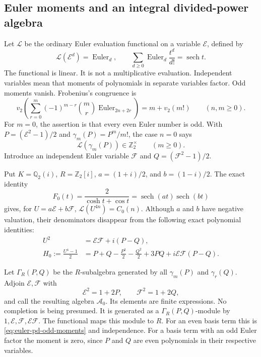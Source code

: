 \subsection{Euler moments and an integral divided-power algebra}

Let $\mathcal L$ be the ordinary Euler evaluation functional on a
variable $\mathcal E$, defined by
\[
 \mathcal L(\mathcal E^d)=\operatorname{Euler}_d,
 \qquad \sum_{d\geq0}\operatorname{Euler}_d\frac{t^d}{d!}
                  =\operatorname{sech}t.
\]
The functional is linear. It is not a multiplicative evaluation.
Independent variables mean that moments of polynomials in separate
variables factor. Odd moments vanish. Frobenius's congruence is
\begin{equation}
 v_2\left(\sum_{r=0}^m(-1)^{m-r}\binom mr
                 \operatorname{Euler}_{2n+2r}\right)
       =m+v_2(m!)\qquad(n,m\geq0).
 \label{eq:classical-frobenius-exact}
\end{equation}
For $m=0$, the assertion is that every even Euler number is odd.
With $P=(\mathcal E^2-1)/2$ and
$\gamma_m(P)=P^m/m!$, the case $n=0$ says
\begin{equation}
 \mathcal L(\gamma_m(P))\in\mathbb Z_2^{\times}
                 \qquad(m\geq0).
 \label{eq:euler-pd-odd-moments}
\end{equation}
Introduce an independent Euler variable $\mathcal F$ and
$Q=(\mathcal F^2-1)/2$.

Put $K=\mathbb Q_2(i)$, $R=\mathbb Z_2[i]$,
$a=(1+i)/2$, and $b=(1-i)/2$. The exact identity
\begin{equation}
 F_0(t)=\frac{2}{\cosh t+\cos t}
       =\operatorname{sech}(at)\operatorname{sech}(bt)
 \label{eq:four-euler-factorization}
\end{equation}
gives, for $U=a\mathcal E+b\mathcal F$,
$\mathcal L(U^{4n})=C_0(n)$. Although $a$ and $b$ have negative
valuation, their denominators disappear from the following exact
polynomial identities:
\begin{align}
 U^2&=\mathcal E\mathcal F+i(P-Q),\nonumber\\
 H_0:=\frac{U^4-1}{2}
   &=P+Q-\frac{P^2}{2}-\frac{Q^2}{2}
                 +3PQ+i\mathcal E\mathcal F(P-Q).
 \label{eq:four-euler-H}
\end{align}

Let $\Gamma_R(P,Q)$ be the $R$-subalgebra generated by all
$\gamma_m(P)$ and $\gamma_r(Q)$. Adjoin $\mathcal E,\mathcal F$ with
\[
 \mathcal E^2=1+2P,\qquad \mathcal F^2=1+2Q,
\]
and call the resulting algebra $\mathcal A_0$. Its elements are finite
expressions. No completion is being presumed. It is generated as a
$\Gamma_R(P,Q)$-module by $1,\mathcal E,\mathcal F,\mathcal E\mathcal F$.
The functional maps this module to $R$. For an even basis term this is
\eqref{eq:euler-pd-odd-moments} and independence. For a basis term with
an odd Euler factor the moment is zero, since $P$ and $Q$ are even
polynomials in their respective variables.

